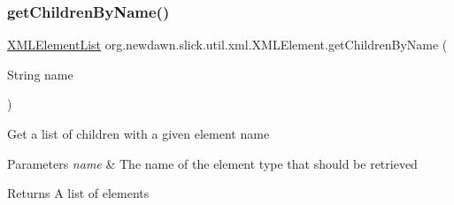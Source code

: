 \subsubsection{\texorpdfstring{get\+Children\+By\+Name()}{getChildrenByName()}}
{\footnotesize\ttfamily \mbox{\hyperlink{classorg_1_1newdawn_1_1slick_1_1util_1_1xml_1_1_x_m_l_element_list}{X\+M\+L\+Element\+List}} org.\+newdawn.\+slick.\+util.\+xml.\+X\+M\+L\+Element.\+get\+Children\+By\+Name (\begin{DoxyParamCaption}\item[{String}]{name }\end{DoxyParamCaption})\hspace{0.3cm}{\ttfamily [inline]}}

Get a list of children with a given element name


\begin{DoxyParams}{Parameters}
{\em name} & The name of the element type that should be retrieved \\
\hline
\end{DoxyParams}
\begin{DoxyReturn}{Returns}
A list of elements 
\end{DoxyReturn}

